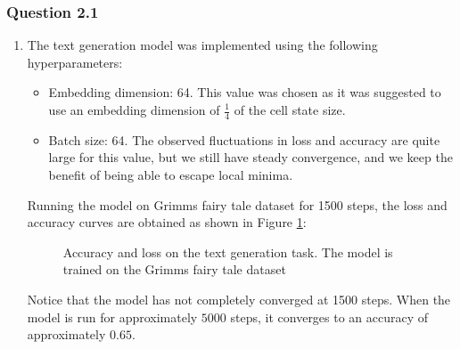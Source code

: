 \documentclass{article}
\begin{document}
\subsubsection*{Question 2.1}
\begin{enumerate}[label = (\alph*)]
	\item The text generation model was implemented using the following hyperparameters:
	\begin{itemize}
		\item Embedding dimension: 64. This value was chosen as it was suggested to use an embedding dimension of $\frac{1}{4}$ of the cell state size.
		\item Batch size: 64. The observed fluctuations in loss and accuracy are quite large for this value, but we still have steady convergence, and we keep the benefit of being able to escape local minima.
	\end{itemize}
	Running the model on Grimms fairy tale dataset for 1500 steps, the loss and accuracy curves are obtained as shown in Figure \ref{fig:texgenacc}:
	\begin{figure}[H]
		\centering
		\caption{Accuracy and loss on the text generation task. The model is trained on the Grimms fairy tale dataset}
		\label{fig:texgenacc}
	\end{figure}
	Notice that the model has not completely converged at 1500 steps. When the model is run for approximately $5000$ steps, it converges to an accuracy of approximately $0.65$. 

\end{enumerate}
\end{document}
